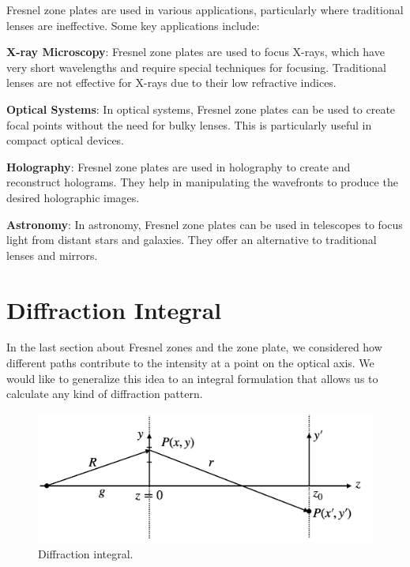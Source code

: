 \documentclass[
  a4paper,
]{book}
\begin{document}
Fresnel zone plates are used in various applications, particularly where
traditional lenses are ineffective. Some key applications include:

\textbf{X-ray Microscopy}: Fresnel zone plates are used to focus X-rays,
which have very short wavelengths and require special techniques for
focusing. Traditional lenses are not effective for X-rays due to their
low refractive indices.

\textbf{Optical Systems}: In optical systems, Fresnel zone plates can be
used to create focal points without the need for bulky lenses. This is
particularly useful in compact optical devices.

\textbf{Holography}: Fresnel zone plates are used in holography to
create and reconstruct holograms. They help in manipulating the
wavefronts to produce the desired holographic images.

\textbf{Astronomy}: In astronomy, Fresnel zone plates can be used in
telescopes to focus light from distant stars and galaxies. They offer an
alternative to traditional lenses and mirrors.

\chapter{Diffraction Integral}\label{diffraction-integral}

In the last section about Fresnel zones and the zone plate, we
considered how different paths contribute to the intensity at a point on
the optical axis. We would like to generalize this idea to an integral
formulation that allows us to calculate any kind of diffraction pattern.

\begin{figure}[H]

{\centering \includegraphics[width=0.8\linewidth,height=\textheight,keepaspectratio]{wave-optics/img/sketch.png}

}

\caption{Diffraction integral.}

\end{figure}%
\end{document}
